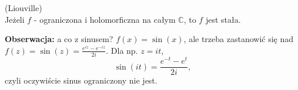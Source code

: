 \documentclass[../main.tex]{subfiles}
\begin{document}
\begin{tw}
    (Liouville)\\
    Jeżeli $f$ - ograniczona i holomorficzna na całym $\mathbb{C}$, to $f$ jest stała.
\end{tw}
\textbf{Obserwacja:} a co z sinusem?
$f(x) = \sin(x)$, ale trzeba zastanowić się nad  $f(z) = \sin(z) = \frac{e^{iz} - e^{-iz}}{2i}$. Dla np. $z = it$,
\[
    \sin(it) = \frac{e^{-t} - e^{t}}{2i}
,\]
czyli oczywiście sinus ograniczony nie jest.
\end{document}
